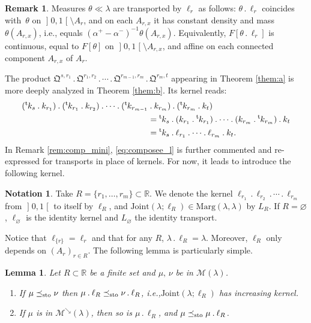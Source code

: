 \documentclass[11pt]{article}
\newcommand{\ie}{i.e.,\xspace}
\newcommand{\ldot}{\mathbin{.}}
\newcommand{\lcdots}{\ldot\cdots\ldot}
\theoremstyle{plain}
\newtheorem{lem}[them]{Lemma}
\theoremstyle{definition}
\newtheorem{notation}[them]{Notation} %
\newtheorem{rem}[them]{Remark}
\newcommand{\join}{\mathrm{Joint}}
\newcommand{\como}{\mathfrak{Q}}
\newcommand{\trans}{{}^{\mathrm{t}}\mkern-1mu}
\newcommand{\la}{\lambda}
\newcommand{\m}{\mathcal{M}}
\newcommand{\ma}{\mathrm{Marg}}
\newcommand{\R}{\mathbb{R}}
\newcommand{\leqs}{\preceq_{\text{\rm sto}}}
\newcommand{\mdec}{\mathcal{M}^{\scriptscriptstyle\searrow}}
\newcommand{\op}{\mathopen}
\newcommand{\clo}{\mathclose}
\begin{document}
\begin{rem}\label{rem:action_l}Measures $\theta\ll \la$ are transported by $\ell_r$ as follows: $\theta\ldot \ell_r$ coincides with~$\theta$ on $\op]0,1\clo[\setminus A_r$, and on each $A_{r,x}$ it has constant density and mass $\theta(A_{r,x})$, \ie equals $(\alpha^+-\alpha^-)^{-1}\theta(A_{r,x})$. Equivalently, $F[\theta\ldot \ell_r]$ is continuous, equal to $F[\theta]$ on $\op]0,1\clo[\setminus A_{r,x}$, and affine on each connected component $A_{r,x}$ of $A_r$.
\end{rem}

The product $\como^{s,r_1}{}\ldot\como^{r_1,r_2}\lcdots \como^{r_{m-1},r_m}{}\ldot\como^{r_m,t}$ appearing in Theorem \ref{them:a} is more deeply analyzed in Theorem \ref{them:b}. Its kernel reads:
\begin{equation}\label{eq:composee_l}
\begin{aligned}
(\trans k_s\ldot k_{r_1})\ldot(\trans k_{r_1}{}\ldot k_{r_2})\lcdots (\trans k_{r_{m-1}}&\ldot k_{r_m})\ldot(\trans k_{r_m}{}\ldot k_t)\\
&= \trans k_s\ldot(k_{r_1}{}\ldot\trans k_{r_1})\lcdots (k_{r_m}{}\ldot\trans k_{r_m})\ldot k_t\\
&=\trans k_s\ldot\ell_{r_1}\lcdots \ell_{r_m}{}\ldot k_t.
\end{aligned}
\end{equation}
In Remark \ref{rem:comp_mini}, \eqref{eq:composee_l} is further commented and re-expressed for transports in place of kernels. For now, it leads to introduce the following kernel.

\begin{notation}\label{notation:Ts}
Take $R=\{r_1,\ldots,r_m\}\!\subset\!\R$. We denote the kernel \hbox{$\ell_{r_1}{}\ldot\ell_{r_2}{}\ldot\cdots\ldot\ell_{r_m}$} from $\op]0,1\clo[$ to itself by $\ell_R$, and $\join(\la;\ell_R)\in\ma(\la,\la)$ by $L_R$. If $R=\varnothing$, $\ell_\varnothing$ is the identity kernel and $L_\varnothing$ the identity transport.
\end{notation}

Notice that $\ell_{\{r\}}=\ell_r$ and that for any $R$, $\la\ldot\ell_R=\la$. Moreover, $\ell_R$ only depends on $(A_r)_{r\in R}$. The following lemma is particularly simple.

\begin{lem}\label{lem:mono1}
Let $R\subset \R$ be a finite set and $\mu,\,\nu$ be in $\m(\la)$.

\begin{enumerate}
\item
\label{item:mono1a} If $\mu\leqs \nu$ then $\mu \ldot\ell_R\leqs \nu\ldot\ell_R$, \ie $\join(\la; \ell_R)$ has increasing kernel.
\item
\label{item:mono1b} If $\mu$ is in $\mdec(\la)$, then so is $\mu \ldot\ell_R$, and $\mu\leqs \mu\ldot\ell_R$.
\end{enumerate}
\end{lem}
\end{document}
